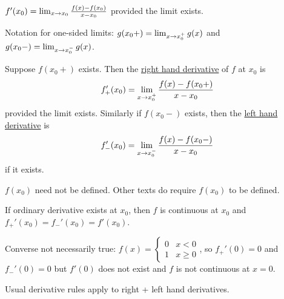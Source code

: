 \documentclass[]{article}
\begin{document}
\begin{recall}
	$f'(x_0) = \lim_{x\rightarrow x_0} \frac{f(x)-f(x_0)}{x-x_0}$ provided the limit exists.
\end{recall}
Notation for one-sided limits: $g(x_0+) = \lim_{x\rightarrow x_0^+} g(x)$ and $g(x_0-) = \lim_{x\rightarrow x_0^-} g(x)$.
\begin{definition}
	Suppose $f(x_0+)$ exists. Then the \underline{right hand derivative} of $f$ at $x_0$ is \begin{equation}f_+'(x_0) = \lim_{x\rightarrow x_0^+} \frac{f(x)-f(x_0+)}{x-x_0}\end{equation} provided the limit exists.
	Similarly if $f(x_0-)$ exists, then the \underline{left hand derivative} is \begin{equation}f_-'(x_0) = \lim_{x\rightarrow x_0^-} \frac{f(x)-f(x_0-)}{x-x_0}\end{equation} if it exists.
\end{definition}
\begin{note}
	$f(x_0)$ need not be defined. Other texts do require $f(x_0)$ to be defined.
\end{note}
\begin{note}
	If ordinary derivative exists at $x_0$, then $f$ is continuous at $x_0$ and $f_+'(x_0)=f_-'(x_0) = f'(x_0)$.
\end{note}
Converse not necessarily true: $f(x) = \begin{cases} 0 & x<0 \\ 1 & x\geq 0 \end{cases}$, so $f_+'(0)=0$ and $f_-'(0)=0$ but $f'(0)$ does not exist and $f$ is not continuous at $x=0$.
\begin{note}
	Usual derivative rules apply to right + left hand derivatives.
\end{note}
\end{document}
